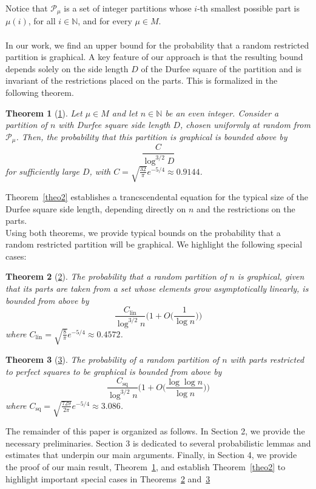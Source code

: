 \documentclass[pdflatex,sn-mathphys-num]{sn-jnl}%
\newtheorem*{theorem*}{Theorem}
\theoremstyle{thmstyleone}%
\theoremstyle{thmstyletwo}%
\theoremstyle{thmstylethree}%
\theoremstyle{thmstylethree}%
\theoremstyle{thmstylethree}%
\begin{document}
Notice that $\mathcal{P}_\mu$ is a set of integer partitions whose $i$-th smallest possible part is $\mu(i)$, for all $i\in\mathbb{N}$, and for every $\mu\in M$. \\
\\
In our work, we find an upper bound for the probability that a random restricted partition is graphical. A key feature of our approach is that the resulting bound depends solely on the side length $D$ of the Durfee square of the partition and is invariant of the restrictions placed on the parts. This is formalized in the following theorem.
\begin{theorem*}[\ref{theo1}]\label{theo1}
    Let $\mu\in M$ and let $n\in\mathbb{N}$ be an even integer. Consider a partition of $n$ with Durfee square side length $D$, chosen uniformly at random from $\mathcal{P}_\mu$. Then, the probability that this partition is graphical is bounded above by
    \begin{equation}
        \frac{C}{\log^{3/2}D}
    \end{equation}
    for sufficiently large $D$, with $C=\sqrt{\frac{32}{\pi}}e^{-5/4}\approx 0.9144$.
\end{theorem*}
Theorem~\ref{theo2} establishes a trancscendental equation for the typical size of the Durfee square side length, depending directly on $n$ and the restrictions on the parts. \\
Using both theorems, we provide typical bounds on the probability that a random restricted partition will be graphical. We highlight the following special cases:
\begin{theorem*}[\ref{theo3}]\label{theo3}
    The probability that a random partition of $n$ is graphical, given that its parts are taken from a set whose elements grow asymptotically linearly, is bounded from above by
\begin{equation}
    \frac{C_\mathrm{lin}}{\log^{3/2}n}\Big(1+O\Big(\frac{1}{\log n}\Big)\Big)
\end{equation}
where $C_\mathrm{lin}=\sqrt{\frac{8}{\pi}}e^{-5/4}\approx0.4572$.
\end{theorem*}

\begin{theorem*}[\ref{theo4}]\label{theo4}
    The probability of a random partition of $n$ with parts restricted to perfect squares to be graphical is bounded from above by
    \begin{equation}
    \frac{C_\mathrm{sq}}{\log^{3/2}n}\Big(1+O\Big(\frac{\log\log n}{\log n}\Big)\Big)
\end{equation}
where $C_\mathrm{sq}=\sqrt{\frac{729}{2\pi}}e^{-5/4}\approx3.086$.
\end{theorem*}
\vspace{0.4cm}
The remainder of this paper is organized as follows. In Section 2, we provide the necessary preliminaries. Section 3 is dedicated to several probabilistic lemmas and estimates that underpin our main arguments. Finally, in Section 4, we provide the proof of our main result, Theorem~\ref{theo1}, and establish Theorem~\ref{theo2} to highlight important special cases in Theorems~\ref{theo3} and~\ref{theo4}
\end{document}
